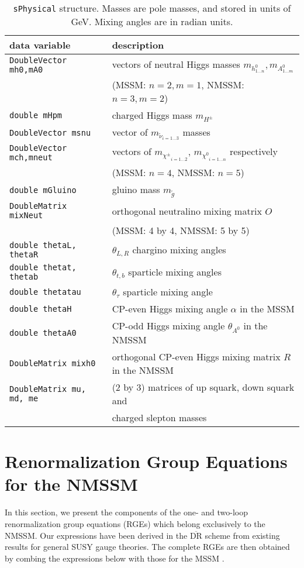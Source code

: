 \documentclass[final,3p,times,pdflatex]{elsarticle}
\def\code#1{\small{\tt #1}\normalsize}
\begin{document}
\begin{table}
  \centering
  \begin{tabular}{ll}
    data variable & description \\ \hline
    \code{DoubleVector mh0,mA0} & vectors of neutral Higgs masses $m_{h^0_{1\ldots n}}, m_{A^0_{1\ldots m}}$\\
    & (MSSM: $n=2, m=1$, NMSSM: $n=3, m=2$) \\
    \code{double mHpm} & charged Higgs mass $m_{H^\pm}$ \\
    \code{DoubleVector msnu} & vector of $m_{{\tilde \nu}_{i=1 \ldots 3}}$ masses \\
    \code{DoubleVector mch,mneut} & vectors of $m_{{\chi^\pm}_{i=1 \ldots 2}}$, 
    $m_{{\chi^0}_{i=1 \ldots n}}$ respectively \\
    & (MSSM: $n=4$, NMSSM: $n=5$) \\
    \code{double mGluino} & gluino mass $m_{\tilde g}$ \\
    \code{DoubleMatrix mixNeut} & orthogonal neutralino mixing matrix $O$\\
    & (MSSM: 4 by 4, NMSSM: 5 by 5)\\
    \code{double thetaL, thetaR} & $\theta_{L, R}$ chargino mixing angles \\
    \code{double thetat, thetab} & $\theta_{t,b}$ sparticle mixing angles \\
    \code{double thetatau} & $\theta_{\tau}$ sparticle mixing angle \\
    \code{double thetaH} & CP-even Higgs mixing angle $\alpha$ in the MSSM \\
    \code{double thetaA0} & CP-odd Higgs mixing angle $\theta_{A^0}$ in the NMSSM \\
    \code{DoubleMatrix mixh0} & orthogonal CP-even Higgs mixing matrix $R$ in the NMSSM \\
    \code{DoubleMatrix mu, md, me} & (2 by 3) matrices of up squark, down squark
    and\\
    &  charged slepton masses \\
  \end{tabular}
  \caption{\label{tab:sphys}\code{sPhysical} structure. Masses are pole
    masses, and stored in units of GeV. Mixing angles are in radian
    units.}
\end{table}

\section{Renormalization Group Equations for the NMSSM}\label{sec:RGEs}
In this section, we present the components of the one- and two-loop renormalization group equations (RGEs) which belong exclusively to the NMSSM.  Our expressions have been derived in the $\overline{\mbox{DR}}$ scheme from existing results \cite{MV94,Yam94} for general SUSY gauge theories. The complete RGEs are then obtained by combing the expressions below with those for the MSSM \cite{MV94}.
\end{document}
